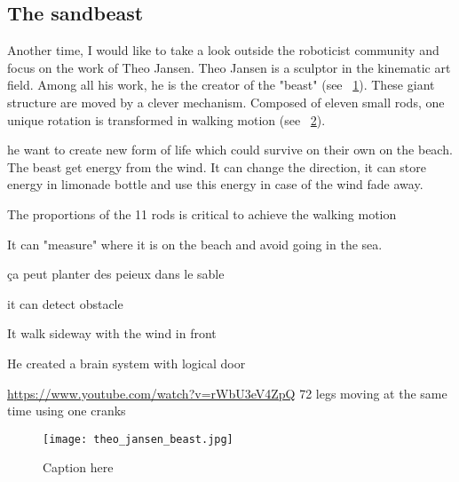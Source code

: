 \subsection{The sandbeast} %
\label{sub:the_sandbeast}


Another time, I would like to take a look outside the roboticist community and focus on the work of Theo Jansen.
Theo Jansen is a sculptor in the kinematic art field. Among all his work, he is the creator of the "beast" (see \figurename~\ref{fig:theo_jansen_beast}). These giant structure are moved by a clever mechanism. Composed of eleven small rods, one unique rotation is transformed in walking motion (see \figurename~\ref{fig:beast_mechanism}).

he want to create new form of life which could survive on their own on the beach. The beast get energy from the wind. It can change the direction, it can store energy in limonade bottle and use this energy in case of the wind fade away.

The proportions of the 11 rods is critical to achieve the walking motion

It can "measure" where it is on the beach and avoid going in the sea.

ça peut planter des peieux dans le sable

it can detect obstacle

It walk sideway with the wind in front

He created a brain system with logical door

\url{https://www.youtube.com/watch?v=rWbU3eV4ZpQ}
72 legs moving at the same time using one cranks


\begin{figure}[]
    \begin{center}
        \texttt{[image: theo\_jansen\_beast.jpg]}
    \end{center}
    \caption{Caption here}
    \label{fig:theo_jansen_beast}
\end{figure}

\begin{figure}[]
\centering
    \hfil
    \hfil
    \caption{}
    \label{fig:beast_mechanism}
\end{figure}


